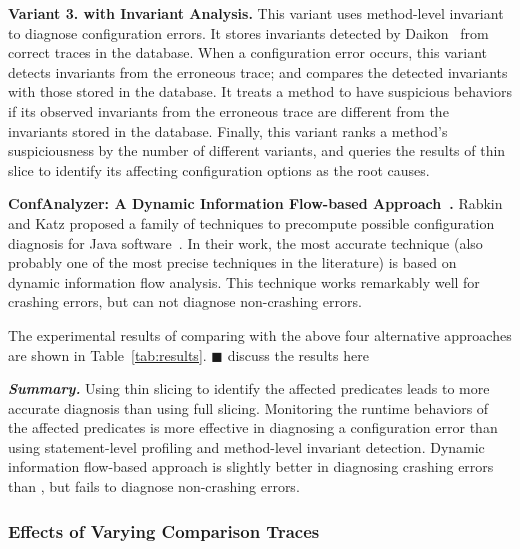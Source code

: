\vspace{1mm}
\noindent \textbf{Variant 3. \ourtool with Invariant Analysis.}
This variant uses method-level invariant
to diagnose configuration errors. It stores invariants detected
by Daikon~\cite{Ernst:1999} from correct traces in the database. When a configuration
error occurs, this variant detects invariants from the erroneous trace;
and compares the detected invariants
with those stored in the database.
It treats a method to have suspicious behaviors if its observed invariants
from the erroneous trace are different from the invariants stored in the database. Finally, this variant ranks
a method's suspiciousness by the number of different variants, and
queries the results of thin slice
to identify its affecting configuration options as the root causes. 

\vspace{1mm}
\noindent \textbf{ConfAnalyzer: A Dynamic Information Flow-based Approach~\cite{Rabkin:2011:PPC}.}
Rabkin and Katz proposed a family of techniques to precompute possible
configuration diagnosis for Java software~\cite{Rabkin:2011:PPC}. In their work,
the most accurate technique (also probably one of the most precise techniques in the literature)
is based on dynamic information flow analysis.
This technique works remarkably well for crashing errors, but can
not diagnose non-crashing errors.

\vspace{1mm}

The experimental results of comparing \ourtool with the above
four alternative approaches are shown in Table~\ref{tab:results}.
$\blacksquare$ discuss the results here

\vspace{1mm}
\noindent \textbf{\textit{Summary.}} Using thin slicing to identify
the affected predicates leads to more accurate diagnosis than using
full slicing. Monitoring the runtime behaviors of the affected
predicates is more effective in diagnosing a configuration error
than using statement-level profiling and method-level invariant detection.
Dynamic information flow-based approach is slightly better in diagnosing
crashing errors than \ourtool, but fails to diagnose non-crashing errors.

\subsubsection{Effects of Varying Comparison Traces}
\label{sec:ranking}


